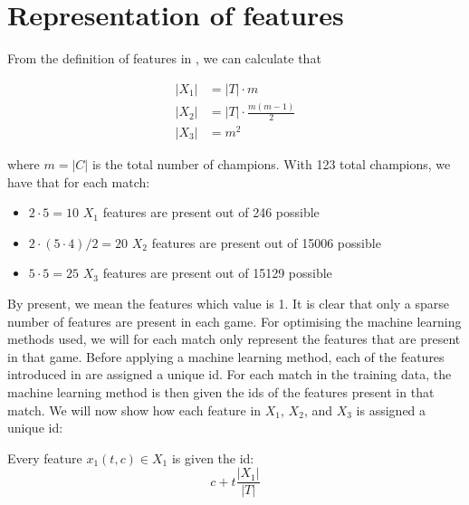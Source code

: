 
\section{Representation of features}
\label{sec:representationoffeatures}
From the definition of features in , we can calculate that

\begin{align}
|X_1| &= |T| \cdot m \\ 
|X_2| &= |T| \cdot \frac{m(m-1)}{2} \\ 
|X_3| &= m^2  
\end{align}

where $m = |C|$ is the total number of champions. With 123 total champions, we have that for each match:
\begin{itemize}
\item $2 \cdot 5 = 10$ $X_1$ features are present out of 246 possible
\item $2 \cdot (5 \cdot 4)/2 = 20$ $X_2$ features are present out of 15006 possible
\item $5 \cdot 5 = 25$ $X_3$ features are present out of 15129 possible
\end{itemize}

By present, we mean the features which value is 1.
It is clear that only a sparse number of features are present in each game. 
For optimising the machine learning methods used, we will for each match only represent the features that are present in that game. 
Before applying a machine learning method, each of the features introduced in  are assigned a unique id.
For each match in the training data, the machine learning method is then given the ids of the features present in that match.
We will now show how each feature in $X_1$, $X_2$, and $X_3$ is assigned a unique id:

\begin{center}
Every feature $x_1(t, c) \in X_1$ is given the id:
\[ c + t \frac{|X_1|}{|T|} \]
\end{center}

